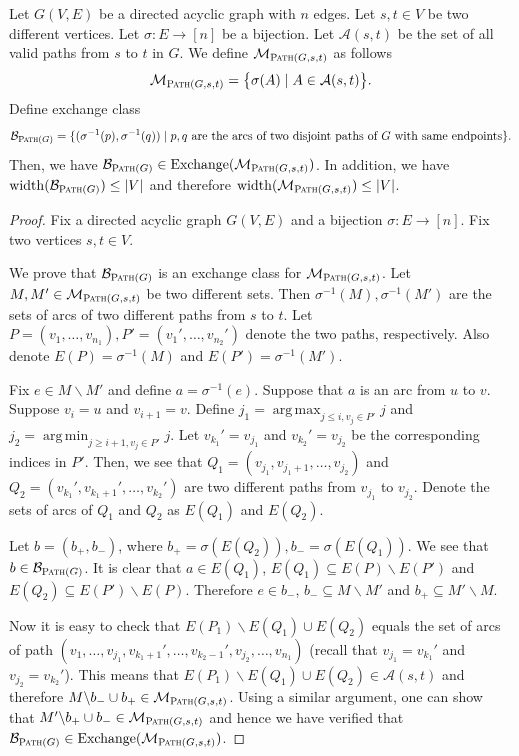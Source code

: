 \documentclass{article}
\newcommand{\M}{\mathcal M}
\newcommand{\B}{\mathcal B}
\newcommand{\del}{\backslash}
\DeclareMathOperator{\rank}{width}
\DeclareMathOperator*{\argmax}{arg\,max}
\DeclareMathOperator*{\argmin}{arg\,min}
\DeclareMathOperator{\Exchange}{Exchange}
\newcommand{\Path}{\textsc{Path}\xspace}
\begin{document}
\begin{fact}[Path]
\label{fact:path}
Let $G(V,E)$ be a directed acyclic graph with $n$ edges.
Let $s,t\in V$ be two different vertices.
Let $\sigma\colon E\rightarrow [n]$ be a bijection.
Let $\mathcal A(s,t)$ be the set of all valid paths from $s$ to $t$ in $G$. 
We define $\M_{\Path(G,s,t)}$ as follows
$$
\M_{\Path(G,s,t)} = \big\{\sigma(A) \mid A\in\mathcal A(s,t) \big\}.
$$
Define exchange class
$$
\B_{\Path(G)} = \{(\sigma^{-1}(p), \sigma^{-1}(q)) \mid p,q \text{ are the arcs of two disjoint paths of }G\text{ with same endpoints}\}.
$$
Then, we have $\B_{\Path(G)} \in \Exchange(\M_{\Path(G,s,t)})$. 
In addition, we have $\rank(\B_{\Path(G)}) \le |V|$ and therefore $\rank(\M_{\Path(G,s,t)}) \le |V|$.
\end{fact}

\begin{proof}
Fix  a directed acyclic graph $G(V,E)$ and a bijection $\sigma\colon E\rightarrow [n]$. 
Fix two vertices $s,t\in V$.

We prove that $\B_{\Path(G)}$ is an exchange class for $\M_{\Path(G,s,t)}$.
Let $M,M' \in \M_{\Path(G,s,t)}$ be two different sets. 
Then $\sigma^{-1}(M),\sigma^{-1}(M')$ are the sets of arcs of two different paths from $s$ to $t$.
Let $P=(v_1,\ldots,v_{n_1}),P'=(v_1',\ldots,v_{n_2}')$ denote the two paths, respectively. 
Also denote $E(P) = \sigma^{-1}(M)$ and $E(P') = \sigma^{-1}(M')$.


Fix $e\in M\del M'$ and define $a=\sigma^{-1}(e)$.
Suppose that $a$ is an arc from $u$ to $v$.
Suppose $v_i=u$ and $v_{i+1} = v$.
Define $j_1 = \argmax_{j \le i, v_j\in P'} j$ and $j_2 = \argmin_{j \ge i+1, v_j \in P'} j$.
Let $v_{k_1}' = v_{j_1}$ and $v_{k_2}'= v_{j_2}$ be the corresponding indices in $P'$.
Then, we see that $Q_1=(v_{j_1},v_{j_1+1},\ldots,v_{j_2})$ and $Q_2= (v_{k_1}',v_{k_1+1}', \ldots,v_{k_2}')$ are two different paths from $v_{j_1}$ to $v_{j_2}$. 
Denote the sets of arcs of $Q_1$ and $Q_2$ as $E(Q_1)$ and $E(Q_2)$. 

Let $b=(b_+,b_-)$, where $b_+=\sigma(E(Q_2)), b_-=\sigma(E(Q_1))$. We see that $b \in \B_{\Path(G)}$.
It is clear that $a\in E(Q_1)$, $E(Q_1) \subseteq E(P) \del E(P')$ and $E(Q_2) \subseteq E(P') \del E(P)$. 
Therefore $e\in b_-$, $b_-\subseteq M\del M'$ and $b_+\subseteq M'\del M$.

Now it is easy to check that $E(P_1)\del E(Q_1) \cup E(Q_2)$ equals the set of arcs of path $(v_1,\ldots, v_{j_1}, v_{k_1+1}',\ldots, v_{k_2-1}', v_{j_2},\ldots, v_{n_1})$ (recall that $v_{j_1}=v_{k_1}'$ and $v_{j_2}=v_{k_2}'$).
This means that $E(P_1)\del E(Q_1)\cup E(Q_2) \in \mathcal A(s,t)$ and therefore $M\del b_-\cup b_+ \in \M_{\Path(G,s,t)}$.
Using a similar argument, one can show that $M'\del b_+\cup b_- \in \M_{\Path(G,s,t)}$ and hence we have verified that 
$\B_{\Path(G)}\in\Exchange(\M_{\Path(G,s,t)})$.
\end{proof}
\end{document}
